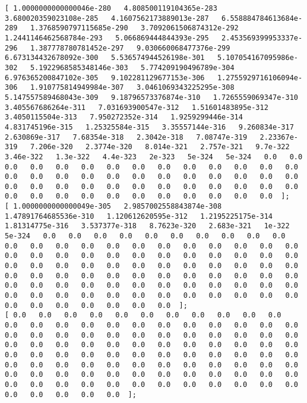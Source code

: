 \documentclass[11pt]{article}
\begin{document}
\begin{Verbatim}[commandchars=\\\{\}]
[ 1.0000000000000046e-280   4.808500119104365e-283   3.680020359023108e-285   4.1607562173889013e-287   6.558884784613684e-289   1.3768590797115685e-290   3.7092061506874312e-292   1.2441146462568784e-293   5.066869444844393e-295   2.453569399953337e-296   1.387778780781452e-297   9.030660068477376e-299   6.673134432678092e-300   5.536574944526198e-301   5.107054167095986e-302   5.1922968585348146e-303   5.774209190496789e-304   6.976365200847102e-305   9.102281129677153e-306   1.2755929716106094e-306   1.910775814949984e-307   3.0461069343225295e-308   5.147557589468043e-309   9.18796573376874e-310   1.7265559069347e-310   3.405567686264e-311   7.031693900547e-312   1.51601483895e-312   3.4050115504e-313   7.950272352e-314   1.9259299446e-314   4.831745196e-315   1.25325584e-315   3.35557144e-316   9.260834e-317   2.630869e-317   7.68354e-318   2.3042e-318   7.08747e-319   2.23367e-319   7.206e-320   2.3774e-320   8.014e-321   2.757e-321   9.7e-322   3.46e-322   1.3e-322   4.4e-323   2e-323   5e-324   5e-324   0.0   0.0   0.0   0.0   0.0   0.0   0.0   0.0   0.0   0.0   0.0   0.0   0.0   0.0   0.0   0.0   0.0   0.0   0.0   0.0   0.0   0.0   0.0   0.0   0.0   0.0   0.0   0.0   0.0   0.0   0.0   0.0   0.0   0.0   0.0   0.0   0.0   0.0   0.0   0.0   0.0   0.0   0.0   0.0   0.0   0.0   0.0   0.0   0.0  ];
[ 1.0000000000000049e-305   2.9857002558843874e-308   1.47891764685536e-310   1.120612620595e-312   1.2195225175e-314   1.81314775e-316   3.537377e-318   8.7623e-320   2.683e-321   1e-322   5e-324   0.0   0.0   0.0   0.0   0.0   0.0   0.0   0.0   0.0   0.0   0.0   0.0   0.0   0.0   0.0   0.0   0.0   0.0   0.0   0.0   0.0   0.0   0.0   0.0   0.0   0.0   0.0   0.0   0.0   0.0   0.0   0.0   0.0   0.0   0.0   0.0   0.0   0.0   0.0   0.0   0.0   0.0   0.0   0.0   0.0   0.0   0.0   0.0   0.0   0.0   0.0   0.0   0.0   0.0   0.0   0.0   0.0   0.0   0.0   0.0   0.0   0.0   0.0   0.0   0.0   0.0   0.0   0.0   0.0   0.0   0.0   0.0   0.0   0.0   0.0   0.0   0.0   0.0   0.0   0.0   0.0   0.0   0.0   0.0   0.0   0.0   0.0   0.0   0.0  ];
[ 0.0   0.0   0.0   0.0   0.0   0.0   0.0   0.0   0.0   0.0   0.0   0.0   0.0   0.0   0.0   0.0   0.0   0.0   0.0   0.0   0.0   0.0   0.0   0.0   0.0   0.0   0.0   0.0   0.0   0.0   0.0   0.0   0.0   0.0   0.0   0.0   0.0   0.0   0.0   0.0   0.0   0.0   0.0   0.0   0.0   0.0   0.0   0.0   0.0   0.0   0.0   0.0   0.0   0.0   0.0   0.0   0.0   0.0   0.0   0.0   0.0   0.0   0.0   0.0   0.0   0.0   0.0   0.0   0.0   0.0   0.0   0.0   0.0   0.0   0.0   0.0   0.0   0.0   0.0   0.0   0.0   0.0   0.0   0.0   0.0   0.0   0.0   0.0   0.0   0.0   0.0   0.0   0.0   0.0   0.0   0.0   0.0   0.0   0.0   0.0  ];

\end{Verbatim}
\end{document}
